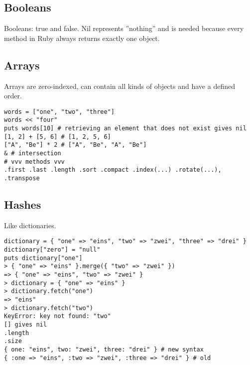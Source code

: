 \documentclass{a5charun}
\begin{document}
\subsection{Booleans}
Booleans: true and false.
Nil represents ''nothing'' and is needed because every method in Ruby always returns exactly one object.

\subsection{Arrays}
Arrays are zero-indexed, can contain all kinds of objects and have a defined order.
\begin{verbatim}
words = ["one", "two", "three"]
words << "four"
puts words[10] # retrieving an element that does not exist gives nil
[1, 2] + [5, 6] # [1, 2, 5, 6]
["A", "Be"] * 2 # ["A", "Be", "A", "Be"]
& # intersection
# vvv methods vvv
.first .last .length .sort .compact .index(...) .rotate(...), .transpose
\end{verbatim}


\subsection{Hashes}
Like dictionaries.
\begin{verbatim}
dictionary = { "one" => "eins", "two" => "zwei", "three" => "drei" }
dictionary["zero"] = "null"
puts dictionary["one"]
> { "one" => "eins" }.merge({ "two" => "zwei" })
=> { "one" => "eins", "two" => "zwei" }
> dictionary = { "one" => "eins" }
> dictionary.fetch("one")
=> "eins"
> dictionary.fetch("two")
KeyError: key not found: "two"
[] gives nil
.length
.size
{ one: "eins", two: "zwei", three: "drei" } # new syntax
{ :one => "eins", :two => "zwei", :three => "drei" } # old
\end{verbatim}
\end{document}
